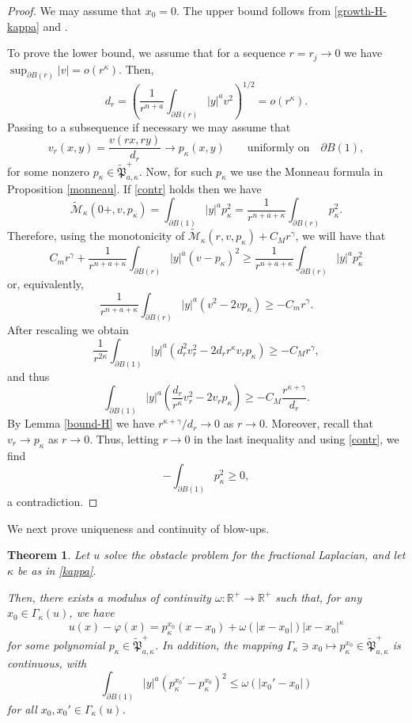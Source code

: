 \documentclass[11pt]{amsart}
\theoremstyle{plain}
\newtheorem{thrm}{Theorem}[section]
\numberwithin{equation}{section}
\begin{document}
\begin{proof}
We may assume that $x_0=0$.
The upper bound follows from \eqref{growth-H-kappa} and \cite[Lemma 3.4]{BFR}.

To prove the lower bound, we assume that for a sequence $r=r_j\to0$ we have $\sup_{\partial{B(r)}}|v|= o(r^\kappa)$.
Then,
\begin{equation}\label{contr}
d_r=\left(\frac{1}{r^{n+a}}\int_{\partial{B(r)}}|y|^a v^2\right)^{1/2}=o(r^\kappa).
\end{equation}
Passing to a subsequence if necessary we may assume that
\[v_r(x,y)=\frac{v(rx,ry)}{d_r}\to p_\kappa(x,y)\qquad \textrm{uniformly on}\quad \partial{B(1)},\]
for some nonzero $p_\kappa\in\tilde{\mathfrak P}_{a,\kappa}^+$.
Now, for such $p_\kappa$ we use the Monneau formula in Proposition \ref{monneau}.
If \eqref{contr} holds then we have
\[\tilde{\mathcal M}_\kappa(0+,v,p_\kappa)=\int_{\partial{B(1)}}|y|^a p_\kappa^2=\frac{1}{r^{n+a+\kappa}}\int_{\partial{B(r)}}p_\kappa^2.\]
Therefore, using the monotonicity of $\tilde{\mathcal M}_\kappa(r,v,p_\kappa)+C_Mr^{\gamma}$, we will have that
\[C_mr^\gamma+\frac{1}{r^{n+a+\kappa}}\int_{\partial{B(r)}}|y|^a(v-p_\kappa)^2\geq \frac{1}{r^{n+a+\kappa}}\int_{\partial{B(r)}}|y|^ap_\kappa^2\]
or, equivalently,
\[\frac{1}{r^{n+a+\kappa}}\int_{\partial{B(r)}}|y|^a(v^2-2v p_\kappa)\geq -C_mr^\gamma.\]
After rescaling we obtain
\[\frac{1}{r^{2\kappa}}\int_{\partial{B(1)}} |y|^a(d_r^2v_r^2-2d_rr^\kappa v_rp_\kappa)\geq -C_Mr^\gamma,\]
and thus
\[\int_{\partial{B(1)}} |y|^a\left(\frac{d_r}{r^\kappa}v_r^2-2 v_rp_\kappa\right)\geq -C_M\frac{r^{\kappa+\gamma}}{d_r}.\]
By Lemma \ref{bound-H} we have $r^{\kappa+\gamma}/d_r\to0$ as $r\to0$.
Moreover, recall that $v_r\to p_\kappa$ as $r\to0$.
Thus, letting $r\to0$ in the last inequality and using \eqref{contr}, we find
\[-\int_{\partial{B(1)}}p_\kappa^2\geq0,\]
a contradiction.
\end{proof}

We next prove uniqueness and continuity of blow-ups.

\begin{thrm}\label{uniqeness}
Let $u$ solve the obstacle problem for the fractional Laplacian, and let $\kappa$ be as in \eqref{kappa}.

Then, there exists a modulus of continuity $\omega:{\mathbb R}^+\to{\mathbb R}^+$ such that, for any $x_0\in \Gamma_\kappa(u)$, we have
\[u(x)-\varphi(x)=p_\kappa^{x_0}(x-x_0)+\omega(|x-x_0|)|x-x_0|^\kappa\]
for some polynomial $p_\kappa\in \tilde{\mathfrak P}_{a,\kappa}^+$.
In addition, the mapping $\Gamma_\kappa\ni x_0\mapsto p_\kappa^{x_0}\in\tilde{\mathfrak P}_{a,\kappa}^+$ is continuous, with
\[\int_{\partial{B(1)}} |y|^a(p_\kappa^{x_0'}-p_\kappa^{x_0})^2\leq \omega(|x_0'-x_0|)\]
for all $x_0,x_0'\in \Gamma_\kappa(u)$.
\end{thrm}
\end{document}
